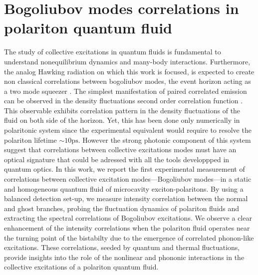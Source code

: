 

\newcommand{\hf}{\hat{f}}
\newcommand{\hX}{\hat{X}}
\newcommand{\hY}{\hat{Y}}

\graphicspath{{./}{./fig/}{./chap_correlation/fig/}}

\chapter{Bogoliubov modes correlations in polariton quantum fluid}

\label{chap:correlation}

The study of collective excitations in quantum fluids is fundamental to understand nonequilibrium dynamics and many-body interactions. Furthermore, the analog Hawking radiation
on which this work is focused, is expected to create non classical correlations between bogoliubov modes, the event horizon acting as a two mode squeezer \cite{agullo_symplectic_2022}. The simplest manifestation
of paired correlated emission can be observed in the density fluctuations second order correlation function \cite{nguyen_acoustic_2015, carusotto_stimulatedfluid_2016,jacquet_quantum_2023,steinhauer_observation_2016}.
This observable exhibits correlation pattern in the density fluctuations of the fluid on both side of the horizon.
Yet, this has been done only numerically in polaritonic system since the experimental equivalent would require to resolve the polariton lifetime $\sim 10 \mathrm{ps}$. However 
the strong photonic component of this system suggest that correlations between collective excitations modes must have an optical signature that could be adressed
with all the tools developpped in quantum optics.
In this work, we report the first experimental measurement of correlations between collective excitation modes—Bogoliubov modes—in a static and homogeneous quantum fluid of microcavity exciton-polaritons.
 By using a balanced detection set-up, we measure intensity correlation between the normal and ghost branches, probing the fluctuation dynamics of polariton fluids and extracting the spectral correlations of Bogoliubov excitations.
  We observe a clear enhancement of the intensity correlations when the polariton fluid operates near the turning point of the bistabilty due to the emergence of correlated phonon-like excitations. These correlations, seeded by quantum and thermal fluctuations, provide insights into the role of the nonlinear and phononic interactions in the collective excitations of a polariton quantum fluid.

